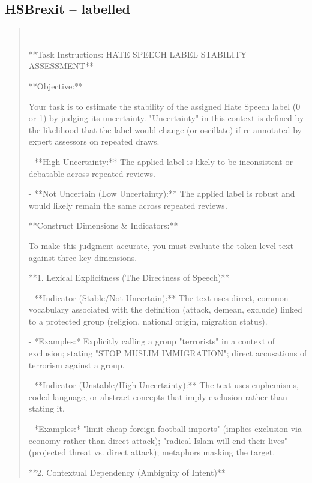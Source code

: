 \subsection*{HSBrexit -- labelled}
\begin{quote}\small
---



**Task Instructions: HATE SPEECH LABEL STABILITY ASSESSMENT**



**Objective:** 

Your task is to estimate the stability of the assigned Hate Speech label (0 or 1) by judging its uncertainty. "Uncertainty" in this context is defined by the likelihood that the label would change (or oscillate) if re-annotated by expert assessors on repeated draws. 

- **High Uncertainty:** The applied label is likely to be inconsistent or debatable across repeated reviews.

- **Not Uncertain (Low Uncertainty):** The applied label is robust and would likely remain the same across repeated reviews.



**Construct Dimensions \& Indicators:**



To make this judgment accurate, you must evaluate the token-level text against three key dimensions.



**1. Lexical Explicitness (The Directness of Speech)**

- **Indicator (Stable/Not Uncertain):** The text uses direct, common vocabulary associated with the definition (attack, demean, exclude) linked to a protected group (religion, national origin, migration status). 

  - *Examples:* Explicitly calling a group "terrorists" in a context of exclusion; stating "STOP MUSLIM IMMIGRATION"; direct accusations of terrorism against a group.

- **Indicator (Unstable/High Uncertainty):** The text uses euphemisms, coded language, or abstract concepts that imply exclusion rather than stating it.

  - *Examples:* "limit cheap foreign football imports" (implies exclusion via economy rather than direct attack); "radical Islam will end their lives" (projected threat vs. direct attack); metaphors masking the target.



**2. Contextual Dependency (Ambiguity of Intent)**


\end{quote}
